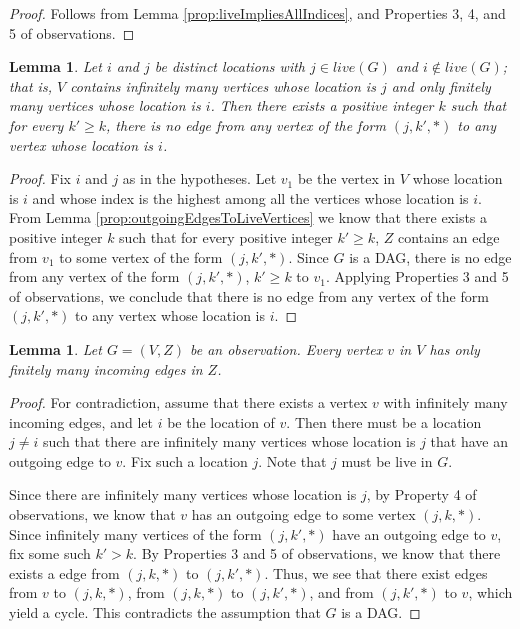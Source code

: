 \documentclass[11pt]{article}
\numberwithin{theorem}{section}
\newtheorem{lemma}[theorem]{Lemma}
\begin{document}
\begin{proof}
Follows from Lemma \ref{prop:liveImpliesAllIndices}, and
Properties 3, 4, and 5 of observations.
\end{proof}




\begin{lemma}
\label{prop:outgoingEdgesToCrashedVertices}
Let $i$ and $j$ be distinct locations with $j \in live(G)$ and $i
\notin live(G)$; that is, $V$ contains infinitely many vertices whose
location is $j$ and only finitely many vertices whose location is $i$.
Then there exists a positive integer $k$ such that for every $k' \geq
k$, there is no edge from any vertex of the form $(j,k',*)$ to any
vertex whose location is $i$.
\end{lemma}

\begin{proof}
Fix $i$ and $j$ as in the hypotheses.
Let $v_1$ be the vertex in $V$ whose location is $i$ and whose index
is the highest among all the vertices whose location is $i$.
From Lemma \ref{prop:outgoingEdgesToLiveVertices} we know that
there exists a positive integer $k$ such that for every positive
integer $k' \geq k$, $Z$ contains an edge from $v_1$ to some vertex of the
form $(j,k',*)$. 
Since $G$ is a DAG, there is no edge from any vertex of the form
$(j,k',*)$, $k' \geq k$ to $v_1$. 
Applying Properties 3 and 5 of observations, we conclude that
there is no edge from any vertex of the form $(j,k',*)$ to any vertex
whose location is $i$.
\end{proof}

\begin{lemma}
\label{prop:finiteIncomingEdges}
Let $G = (V,Z)$ be an observation.
Every vertex $v$ in $V$ has only finitely many incoming edges in $Z$.
\end{lemma}

\begin{proof}
For contradiction, assume that there exists a vertex $v$ with
infinitely many incoming edges, and let $i$ be the location of $v$.
Then there must be a location $j \neq i$ such that there are
infinitely many vertices whose location is $j$ that have an outgoing
edge to $v$.   
Fix such a location $j$. 
Note that $j$ must be live in $G$.

Since there are infinitely many vertices whose location is $j$, by
Property 4 of observations, we know that $v$ has an outgoing edge to
some vertex $(j,k,*)$. 
Since infinitely many vertices of the form
$(j,k',*)$ have an outgoing edge to $v$, fix some such $k' > k$. 
By Properties 3 and 5 of observations, we know that there exists a
edge from $(j,k,*)$ to $(j,k',*)$. 
Thus, we see that there exist edges from $v$ to $(j,k,*)$, 
from $(j,k,*)$ to $(j,k',*)$, and from $(j,k',*)$ to $v$, which yield a
cycle. 
This contradicts the assumption that $G$ is a DAG. 
\end{proof}
\end{document}
